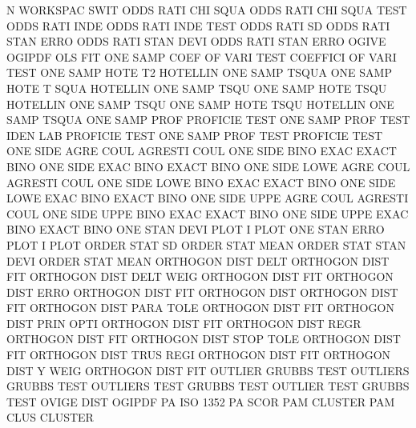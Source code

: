 N                                       WORKSPAC SWIT
ODDS     RATI CHI  SQUA                 ODDS     RATI CHI  SQUA TEST
ODDS     RATI INDE                      ODDS     RATI INDE TEST
ODDS     RATI SD                        ODDS     RATI STAN ERRO
ODDS     RATI STAN DEVI                 ODDS     RATI STAN ERRO
OGIVE                                   OGIPDF
OLS                                     FIT
ONE      SAMP COEF OF   VARI TEST       COEFFICI OF   VARI TEST
ONE      SAMP HOTE T2                   HOTELLIN ONE  SAMP TSQUA
ONE      SAMP HOTE T    SQUA            HOTELLIN ONE  SAMP TSQU
ONE      SAMP HOTE TSQU                 HOTELLIN ONE  SAMP TSQU
ONE      SAMP HOTE TSQU                 HOTELLIN ONE  SAMP TSQUA
ONE      SAMP PROF                      PROFICIE TEST
ONE      SAMP PROF TEST IDEN LAB        PROFICIE TEST
ONE      SAMP PROF TEST                 PROFICIE TEST
ONE      SIDE AGRE COUL                 AGRESTI  COUL
ONE      SIDE BINO EXAC                 EXACT    BINO
ONE      SIDE EXAC BINO                 EXACT    BINO
ONE      SIDE LOWE AGRE COUL            AGRESTI  COUL
ONE      SIDE LOWE BINO EXAC            EXACT    BINO
ONE      SIDE LOWE EXAC BINO            EXACT    BINO
ONE      SIDE UPPE AGRE COUL            AGRESTI  COUL
ONE      SIDE UPPE BINO EXAC            EXACT    BINO
ONE      SIDE UPPE EXAC BINO            EXACT    BINO
ONE      STAN DEVI PLOT                 I        PLOT
ONE      STAN ERRO PLOT                 I        PLOT
ORDER    STAT SD                        ORDER    STAT MEAN
ORDER    STAT STAN DEVI                 ORDER    STAT MEAN
ORTHOGON DIST DELT                      ORTHOGON DIST FIT
ORTHOGON DIST DELT WEIG                 ORTHOGON DIST FIT
ORTHOGON DIST ERRO                      ORTHOGON DIST FIT
ORTHOGON DIST                           ORTHOGON DIST FIT
ORTHOGON DIST PARA TOLE                 ORTHOGON DIST FIT
ORTHOGON DIST PRIN OPTI                 ORTHOGON DIST FIT
ORTHOGON DIST REGR                      ORTHOGON DIST FIT
ORTHOGON DIST STOP TOLE                 ORTHOGON DIST FIT
ORTHOGON DIST TRUS REGI                 ORTHOGON DIST FIT
ORTHOGON DIST Y    WEIG                 ORTHOGON DIST FIT
OUTLIER                                 GRUBBS   TEST
OUTLIERS                                GRUBBS   TEST
OUTLIERS TEST                           GRUBBS   TEST
OUTLIER  TEST                           GRUBBS   TEST
OVIGE    DIST                           OGIPDF
PA                                      ISO      1352 PA   SCOR
PAM                                     CLUSTER
PAM      CLUS                           CLUSTER
